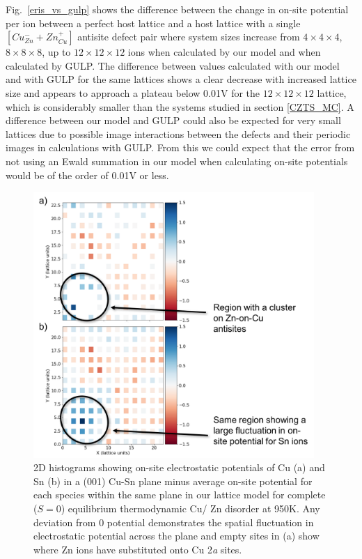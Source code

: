 \documentclass[11pt, twoside]{report}
\begin{document}
Fig.~\ref{eris_vs_gulp} shows the difference between the change in on-site potential per ion between a perfect host lattice and a host lattice with a single $[Cu_{Zn}^{-} + Zn_{Cu}^{+}]$ antisite defect pair where system sizes increase from $4\times4\times4$, $8\times8\times8$, up to $12\times12\times12$ ions when calculated by our model and when calculated by GULP. The difference between values calculated with our model and with GULP for the same lattices shows a clear decrease with increased lattice size and appears to approach a plateau below 0.01V for the $12\times12\times12$ lattice, which is considerably smaller than the systems studied in section \ref{CZTS_MC}. A difference between our model and GULP could also be expected for very small lattices due to possible image interactions between the defects and their periodic images in calculations with GULP. From this we could expect that the error from not using an Ewald summation in our model when calculating on-site potentials would be of the order of 0.01V or less.

\begin{figure}[]
  \centering
    \includegraphics[width=0.95\textwidth]{figures/spatial_pot_Cu-Sn_950K_edit.png}
    \caption{2D histograms showing on-site electrostatic potentials of Cu (a) and Sn (b) in a (001) Cu-Sn plane minus average on-site potential for each species within the same plane in our {\CZTS} lattice model for complete ($S=0$) equilibrium thermodynamic Cu/ Zn disorder at 950K. Any deviation from 0 potential demonstrates the spatial fluctuation in electrostatic potential across the plane and empty sites in (a) show where Zn ions have substituted onto Cu 2\textit{a} sites.}
  \label{spatial_pot_fluc_Cu-Sn}
\end{figure}
\end{document}
